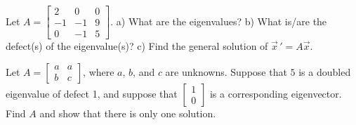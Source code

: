 \documentclass[12pt]{book}
\begin{document}
\begin{exercise}
Let $A =
\left[ \begin{smallmatrix}
2 & 0 & 0 \\
-1 & -1 & 9 \\
0 & -1 & 5
\end{smallmatrix}\right]$.  
a) What are the eigenvalues?  b) What is/are the defect(s) of the
eigenvalue(s)?  c) Find the general solution of $\vec{x}\,' = A\vec{x}$.
\end{exercise}

\begin{exercise}
Let $A =
\left[ \begin{smallmatrix}
a & a \\
b & c
\end{smallmatrix}\right]$, where $a$, $b$, and $c$ are unknowns.
Suppose that $5$ is a doubled eigenvalue of defect 1, and suppose that
$\left[ \begin{smallmatrix}
1 \\ 0
\end{smallmatrix}\right]$ is a corresponding eigenvector.  Find $A$ and show that
there is only one solution.
\end{exercise}
\end{document}
